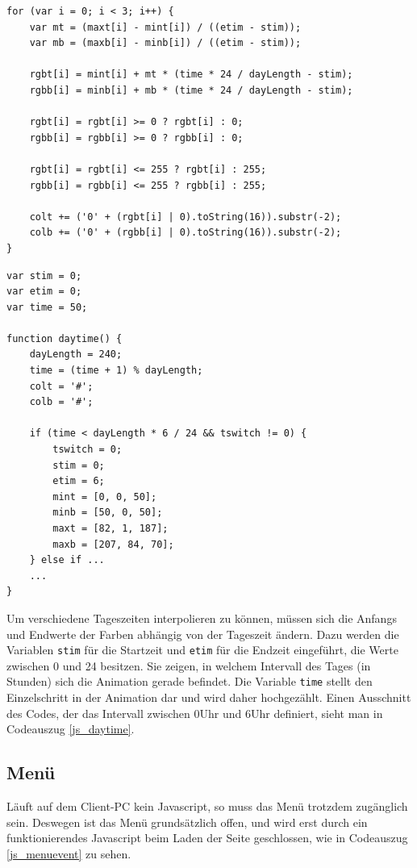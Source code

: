 \begin{lstlisting}[caption=Jede Komponente des Farbvektors wird einzeln interpoliert., label=js_interpol]
for (var i = 0; i < 3; i++) {
	var mt = (maxt[i] - mint[i]) / ((etim - stim));
	var mb = (maxb[i] - minb[i]) / ((etim - stim));
            
	rgbt[i] = mint[i] + mt * (time * 24 / dayLength - stim);
	rgbb[i] = minb[i] + mb * (time * 24 / dayLength - stim);

	rgbt[i] = rgbt[i] >= 0 ? rgbt[i] : 0;
	rgbb[i] = rgbb[i] >= 0 ? rgbb[i] : 0;

	rgbt[i] = rgbt[i] <= 255 ? rgbt[i] : 255;
	rgbb[i] = rgbb[i] <= 255 ? rgbb[i] : 255;

	colt += ('0' + (rgbt[i] | 0).toString(16)).substr(-2);
	colb += ('0' + (rgbb[i] | 0).toString(16)).substr(-2);         
}
\end{lstlisting} 

 \begin{lstlisting}[caption=Die Funktion daytime wird in jedem Animationsframe einmal aufgerufen., label=js_daytime]
var stim = 0;
var etim = 0;
var time = 50;
       
function daytime() {
	dayLength = 240;
	time = (time + 1) % dayLength;
	colt = '#';
	colb = '#';

	if (time < dayLength * 6 / 24 && tswitch != 0) {
		tswitch = 0;
		stim = 0;
		etim = 6;
		mint = [0, 0, 50];
		minb = [50, 0, 50];
		maxt = [82, 1, 187];
		maxb = [207, 84, 70];
	} else if ...
	...
}
\end{lstlisting} 

Um verschiedene Tageszeiten interpolieren zu können, müssen sich die Anfangs und Endwerte der Farben abhängig von der Tageszeit ändern. Dazu werden die Variablen \lstinline{stim} für die Startzeit und \lstinline{etim} für die Endzeit eingeführt, die Werte zwischen 0 und 24 besitzen. Sie zeigen, in welchem Intervall des Tages (in Stunden) sich die Animation gerade befindet. Die Variable \lstinline{time} stellt den Einzelschritt in der Animation dar und wird daher hochgezählt. Einen Ausschnitt des Codes, der das Intervall zwischen 0Uhr und 6Uhr definiert, sieht man in Codeauszug \ref{js_daytime}.

\subsection{Menü}
Läuft auf dem Client-PC kein Javascript, so muss das Menü trotzdem zugänglich sein. Deswegen ist das Menü grundsätzlich offen, und wird erst durch ein funktionierendes Javascript beim Laden der Seite geschlossen, wie in Codeauszug \ref{js_menuevent} zu sehen.

